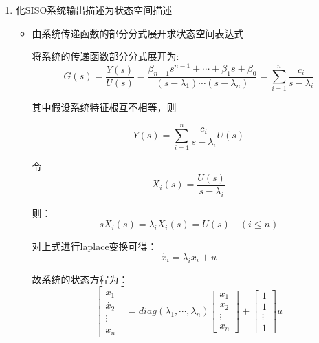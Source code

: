\begin{enumerate}
    \item 化SISO系统输出描述为状态空间描述
    \begin{itemize}
        \item 由系统传递函数的部分分式展开求状态空间表达式

        将系统的传递函数部分分式展开为:
        \begin{equation*}
            G(s) = \frac{Y(s)}{U(s)} = \frac{\beta_{n-1} s^{n-1} + \cdots + \beta_1 s + \beta_0}{(s-\lambda_1)\cdots (s-\lambda_n)} = \sum^n_{i=1} \frac{c_i}{s-\lambda_i}
        \end{equation*}

        其中假设系统特征根互不相等，则

        \begin{equation*}
            Y(s) = \sum_{i=1}^n \frac{c_i}{s-\lambda_i} U(s)
        \end{equation*}

        令
        \begin{equation*}
            X_i(s) = \frac{U(s)}{s-\lambda_i}
        \end{equation*}

        则：
        \begin{equation*}
            s X_i(s) = \lambda_i X_i(s) = U(s)  \quad(i\leq n)
        \end{equation*}

        对上式进行laplace变换可得：
        \begin{equation*}
            \dot{x_i} = \lambda_i x_i + u
        \end{equation*}

        故系统的状态方程为：
        \begin{equation*}
            \left[
                \begin{array}{c}
                    \dot{x_1} \\ \dot{x_2} \\ \vdots \\ \dot{x_n}
                \end{array}
            \right] = diag(\lambda_1,\cdots,\lambda_n) 
            \left[
                \begin{array}{c}
                    x_1 \\ x_2 \\ \vdots \\ x_n
                \end{array}
            \right] + 
            \left[
                \begin{array}{c}
                    1\\ 1 \\ \vdots \\ 1
                \end{array}
            \right] u
        \end{equation*}


\end{itemize}
\end{enumerate}
